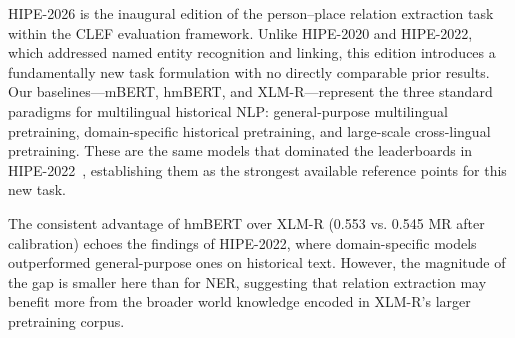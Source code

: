 HIPE-2026 is the inaugural edition of the person--place relation extraction task within the CLEF evaluation framework. Unlike HIPE-2020 and HIPE-2022, which addressed named entity recognition and linking, this edition introduces a fundamentally new task formulation with no directly comparable prior results. Our baselines---mBERT, hmBERT, and XLM-R---represent the three standard paradigms for multilingual historical NLP: general-purpose multilingual pretraining, domain-specific historical pretraining, and large-scale cross-lingual pretraining. These are the same models that dominated the leaderboards in HIPE-2022~\cite{schweter2022,ehrmann2022}, establishing them as the strongest available reference points for this new task.

The consistent advantage of hmBERT over XLM-R (0.553 vs. 0.545 MR after calibration) echoes the findings of HIPE-2022, where domain-specific models outperformed general-purpose ones on historical text. However, the magnitude of the gap is smaller here than for NER, suggesting that relation extraction may benefit more from the broader world knowledge encoded in XLM-R's larger pretraining corpus.







